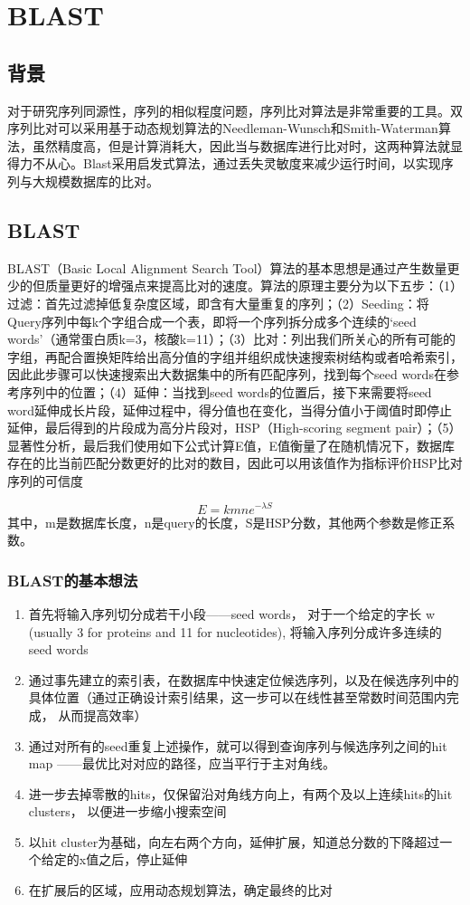 \chapter{BLAST}

\section{背景}
对于研究序列同源性，序列的相似程度问题，序列比对算法是非常重要的工具。双序列比对可以采用基于动态规划算法的Needleman-Wunsch和Smith-Waterman算法，虽然精度高，但是计算消耗大，因此当与数据库进行比对时，这两种算法就显得力不从心。Blast采用启发式算法，通过丢失灵敏度来减少运行时间，以实现序列与大规模数据库的比对。


\section{BLAST}
BLAST（Basic Local Alignment Search Tool）算法的基本思想是通过产生数量更少的但质量更好的增强点来提高比对的速度。算法的原理主要分为以下五步：（1）过滤：首先过滤掉低复杂度区域，即含有大量重复的序列；（2）Seeding：将Query序列中每k个字组合成一个表，即将一个序列拆分成多个连续的‘seed words’（通常蛋白质k=3，核酸k=11）；（3）比对：列出我们所关心的所有可能的字组，再配合置换矩阵给出高分值的字组并组织成快速搜索树结构或者哈希索引，因此此步骤可以快速搜索出大数据集中的所有匹配序列，找到每个seed words在参考序列中的位置；（4）延伸：当找到seed words的位置后，接下来需要将seed word延伸成长片段，延伸过程中，得分值也在变化，当得分值小于阈值时即停止延伸，最后得到的片段成为高分片段对，HSP（High-scoring segment pair）；（5）显著性分析，最后我们使用如下公式计算E值，E值衡量了在随机情况下，数据库存在的比当前匹配分数更好的比对的数目，因此可以用该值作为指标评价HSP比对序列的可信度\par
$$ E = kmne^{-\lambda S}$$
其中，m是数据库长度，n是query的长度，S是HSP分数，其他两个参数是修正系数。
\subsection{BLAST的基本想法}
\begin{enumerate}
    \item 首先将输入序列切分成若干小段——seed words， 对于一个给定的字长 w (usually 3 for proteins and 11 for nucleotides), 将输入序列分成许多连续的 seed words
    \item 通过事先建立的索引表，在数据库中快速定位候选序列，以及在候选序列中的具体位置（通过正确设计索引结果，这一步可以在线性甚至常数时间范围内完成， 从而提高效率）
    \item 通过对所有的seed重复上述操作，就可以得到查询序列与候选序列之间的hit map ——最优比对对应的路径，应当平行于主对角线。
    \item 进一步去掉零散的hits，仅保留沿对角线方向上，有两个及以上连续hits的hit clusters， 以便进一步缩小搜索空间
    \item 以hit cluster为基础，向左右两个方向，延伸扩展，知道总分数的下降超过一个给定的x值之后，停止延伸
    \item 在扩展后的区域，应用动态规划算法，确定最终的比对
\end{enumerate}
